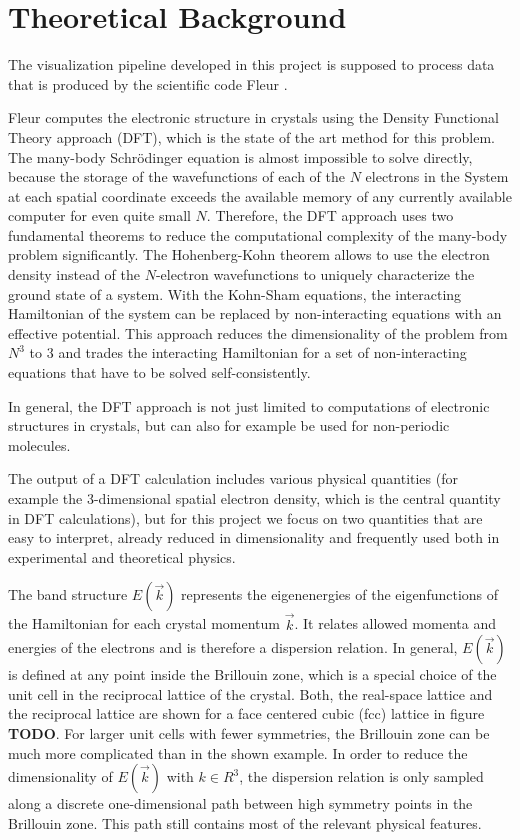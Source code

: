 
\chapter{Theoretical Background}
\label{chap:theory}

The visualization pipeline developed in this project is supposed to process data that is produced by the scientific code Fleur \cite{fleur}.

Fleur computes the electronic structure in crystals using the Density Functional Theory approach (DFT), which is the state of the art method for this problem.
The many-body Schrödinger equation is almost impossible to solve directly,
because the storage of the wavefunctions of each of the $N$ electrons in the
System at each spatial coordinate exceeds the available memory of any currently
available computer for even quite small $N$. Therefore, the DFT approach uses two fundamental theorems to reduce the computational complexity of the many-body problem significantly. 
The Hohenberg-Kohn theorem allows to use the electron density instead of the $N$-electron wavefunctions to uniquely characterize the ground state of a system. With the Kohn-Sham equations, the interacting Hamiltonian of the system can be replaced by non-interacting equations with an effective potential.
This approach reduces the dimensionality of the problem from $N^3$ to $3$ and trades the interacting Hamiltonian for a set of non-interacting equations that have to be solved self-consistently. 

In general, the DFT approach is not just limited to computations of electronic
structures in crystals, but can also for example be used for non-periodic molecules.


The output of a DFT calculation includes various physical quantities (for example the 3-dimensional spatial electron density, which is the central quantity in DFT calculations), but for this project we focus on two quantities that are easy to interpret, already reduced in dimensionality and frequently used both in experimental and theoretical physics.

The band structure $E(\vec{k})$ represents the eigenenergies of the
eigenfunctions of the Hamiltonian for each crystal momentum $\vec{k}$. It
relates allowed momenta and energies of the electrons and is therefore a dispersion relation. In general, $E(\vec{k})$ is defined at any point inside the Brillouin zone, which is a special choice of the unit cell in the reciprocal lattice of the crystal. Both, the real-space lattice and the reciprocal lattice are shown for a face centered cubic (fcc) lattice in figure \textbf{TODO}. For larger unit cells with fewer symmetries, the Brillouin zone can be much more complicated than in the shown example. In order to reduce the dimensionality of $E(\vec{k})$ with $k \in R^3$, the dispersion relation is only sampled along a discrete one-dimensional path between high symmetry points in the Brillouin zone. This path still contains most of the relevant physical features.


